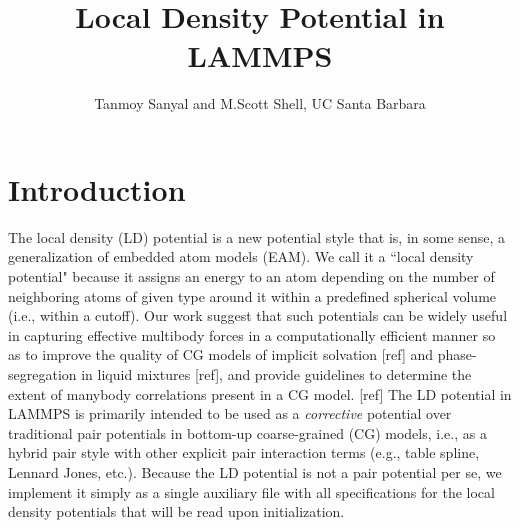 \documentclass[10pt]{article}
\title{Local Density Potential in LAMMPS}
\author{Tanmoy Sanyal and M.Scott Shell, UC Santa Barbara}
\begin{document}
\maketitle

\section*{Introduction}
The local density (LD) potential is a new potential style that is, in some sense, a generalization of embedded atom models (EAM). We call it a ``local density potential" because it assigns an energy to an atom depending on the number of neighboring atoms of given type around it within a predefined spherical volume (i.e., within a cutoff). Our work suggest that such potentials can be widely useful in capturing effective multibody forces in a computationally efficient manner so as to improve the quality of CG models of implicit solvation [ref] and phase-segregation in liquid mixtures [ref], and provide guidelines to determine the extent of manybody correlations present in a CG model. [ref] The LD potential in LAMMPS is primarily intended to be used as a \emph{corrective} potential over traditional pair potentials in bottom-up coarse-grained (CG) models, i.e., as a hybrid pair style with other explicit pair interaction terms (e.g., table spline, Lennard Jones, etc.). Because the LD potential is not a pair potential per se, we implement it simply as a single auxiliary file with all specifications for the local density potentials that will be read upon initialization.\\ 
%
%
%
\end{document}
